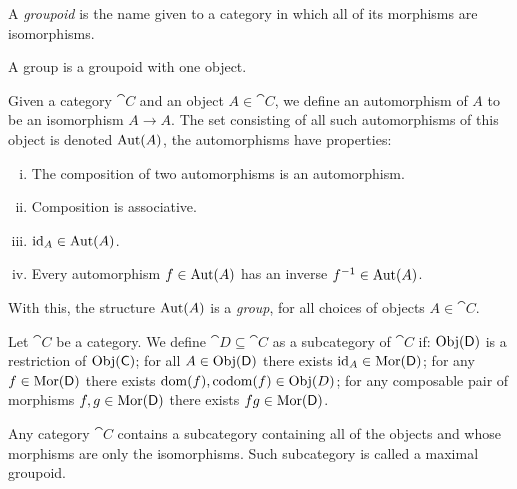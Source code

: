 \begin{definition}[Groupoids]\label{def: groupoids}
  A \emph{groupoid} is the name given to a category in which all of its
  morphisms are isomorphisms. 
\end{definition}

\begin{definition}[Group]\label{def: group}
  A group is a groupoid with one object.
\end{definition}

\begin{definition}[Automorphism]
  Given a category \(\cat C\) and an object  \(A \in \cat C\), we define an
  automorphism of \(A\) to be an isomorphism \(A \to A\). The set consisting of
  all such automorphisms of this object is denoted \(\operatorname{Aut}(A)\), the
  automorphisms have properties:
  \begin{enumerate}[i.]
    \item The composition of two automorphisms is an automorphism.
    \item Composition is associative.
    \item \(\operatorname{id}_A \in \operatorname{Aut}(A)\).
    \item Every automorphism \(f \in \operatorname{Aut}(A)\) has an inverse \(f^{-1}
       \in \operatorname{Aut}(A)\).
  \end{enumerate}
  With this, the structure \(\operatorname{Aut}(A)\) is a \emph{group}, for all choices of
  objects \(A \in \cat{C}\).
\end{definition}

\begin{definition}[Subcategory]\label{def: subcategory}
  Let \(\cat C\) be a category. We define \(\cat D \subseteq \cat C\) as a
  subcategory of \(\cat C\) if: \(\operatorname{Obj}(\mathsf D)\) is a restriction of \(\operatorname{Obj}(\mathsf
  C)\); for all \(A \in \operatorname{Obj}(\mathsf D)\) there exists \(\operatorname{id}_A \in \operatorname{Mor}(\mathsf D)\);
  for any \(f \in \operatorname{Mor}(\mathsf D)\) there exists \(\operatorname{dom}(f), \operatorname{codom}(f) \in
  \operatorname{Obj}(D)\); for any composable pair of morphisms \(f, g \in \operatorname{Mor}(\mathsf D)\)
  there exists \(f g \in \operatorname{Mor}(\mathsf D)\).
\end{definition}

\begin{lemma}
  Any category \(\cat C\) contains a subcategory containing all of the objects
  and whose morphisms are only the isomorphisms. Such subcategory is called a
  maximal groupoid.
\end{lemma}

